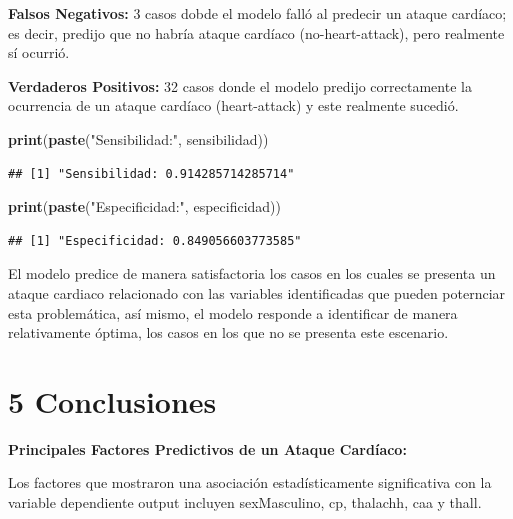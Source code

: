 \documentclass[
]{article}
\newenvironment{Shaded}{\begin{snugshade}}{\end{snugshade}}
\newcommand{\FunctionTok}[1]{\textcolor[rgb]{0.13,0.29,0.53}{\textbf{#1}}}
\newcommand{\NormalTok}[1]{#1}
\newcommand{\StringTok}[1]{\textcolor[rgb]{0.31,0.60,0.02}{#1}}
\begin{document}
\textbf{Falsos Negativos:} 3 casos dobde el modelo falló al predecir un
ataque cardíaco; es decir, predijo que no habría ataque cardíaco
(no-heart-attack), pero realmente sí ocurrió.

\textbf{Verdaderos Positivos:} 32 casos donde el modelo predijo
correctamente la ocurrencia de un ataque cardíaco (heart-attack) y este
realmente sucedió.

\begin{Shaded}
\begin{Highlighting}[]
\FunctionTok{print}\NormalTok{(}\FunctionTok{paste}\NormalTok{(}\StringTok{"Sensibilidad:"}\NormalTok{, sensibilidad))}
\end{Highlighting}
\end{Shaded}

\begin{verbatim}
## [1] "Sensibilidad: 0.914285714285714"
\end{verbatim}

\begin{Shaded}
\begin{Highlighting}[]
\FunctionTok{print}\NormalTok{(}\FunctionTok{paste}\NormalTok{(}\StringTok{"Especificidad:"}\NormalTok{, especificidad))}
\end{Highlighting}
\end{Shaded}

\begin{verbatim}
## [1] "Especificidad: 0.849056603773585"
\end{verbatim}

El modelo predice de manera satisfactoria los casos en los cuales se
presenta un ataque cardiaco relacionado con las variables identificadas
que pueden poternciar esta problemática, así mismo, el modelo responde a
identificar de manera relativamente óptima, los casos en los que no se
presenta este escenario.

\hypertarget{conclusiones}{%
\section{5 Conclusiones}\label{conclusiones}}

\textbf{Principales Factores Predictivos de un Ataque Cardíaco:}

Los factores que mostraron una asociación estadísticamente significativa
con la variable dependiente output incluyen sexMasculino, cp, thalachh,
caa y thall.
\end{document}
